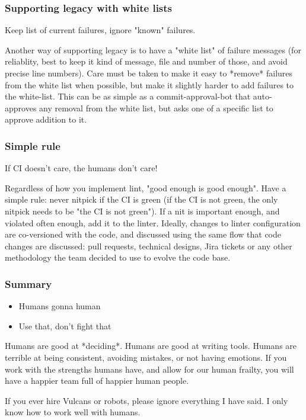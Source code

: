 \begin{frame}
\frametitle{Supporting legacy with white lists}
Keep list of current failures,
ignore "known" failures.
\end{frame}

Another way of supporting legacy is to have a "white list"
of failure messages
(for reliablity,
best to keep it kind of message, file and number of those,
and avoid precise line numbers).
Care must be taken to make it easy to *remove* failures
from the white list when possible,
but make it slightly harder to add failures to the white-list.
This can be as simple as a commit-approval-bot that
auto-approves any removal from the white list,
but asks one of a specific list to approve addition to it.

\begin{frame}
\frametitle{Simple rule}
If CI doesn't care,
the humans don't care!
\end{frame}

Regardless of how you implement lint,
"good enough is good enough".
Have a simple rule:
never nitpick if the CI is green
(if the CI is not green,
the only nitpick needs to be
"the CI is not green").
If a nit is important enough,
and violated often enough,
add it to the linter.
Ideally, changes to linter configuration are co-versioned
with the code,
and discussed using the same flow that code changes are discussed:
pull requests,
technical designs,
Jira tickets
or any other methodology the team decided to use to evolve the code base.

\begin{frame}
\frametitle{Summary}
\begin{itemize}
\item Humans gonna human
\item Use that, don't fight that
\end{itemize}
\end{frame}

Humans are good at *deciding*.
Humans are good at writing tools.
Humans are terrible at being consistent,
avoiding mistakes,
or  not having emotions.
If you work with the strengths humans have,
and allow for our human frailty,
you will have a happier team
full of happier human people.

If you ever hire Vulcans or robots,
please ignore everything I have said.
I only know how to work well with humans.


